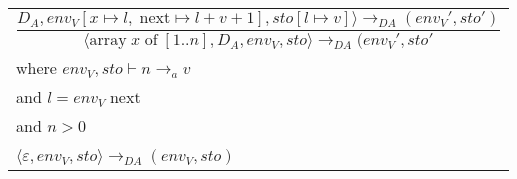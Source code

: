 \begin{table}[H]
\begin{tabular}{l}
$\dfrac{D_A, env_V[x \mapsto l, \; \text{next} \mapsto l + v + 1], sto[l \mapsto v] \rangle \rightarrow_{DA} (env_V', sto')}{\langle \text{array} \; x \; \text{of} \; [1..n], D_A, env_V, sto \rangle \rightarrow_{DA} (env_V', sto'}$ \\
where $env_V, sto \vdash n \rightarrow_a v$ \\
and $l = env_V \; \text{next}$ \\
and $n > 0$ \\
\\
$\langle \varepsilon, env_V, sto \rangle \rightarrow_{DA} (env_V, sto)$
\end{tabular}
\end{table}